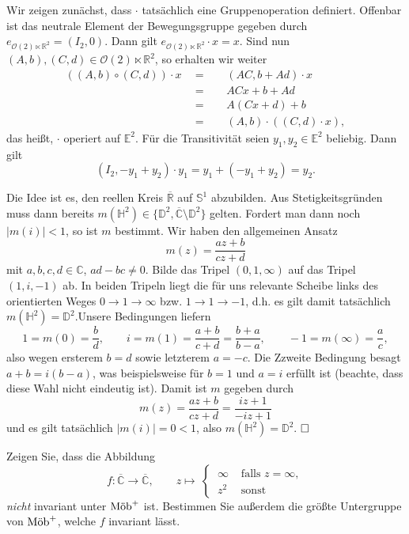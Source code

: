 \documentclass[11pt]{book}
\numberwithin{dummy}{section}
\theoremstyle{nonumberbreak}
\newenvironment{prob}[1][]{\ifthenelse{\equal{#1}{}}{\problem}{\problem[#1]}\rm}{\endproblem}
\newenvironment{sol}[1][]{\ifthenelse{\equal{#1}{}}{\solution}{\solution[#1]}\rm}{\endsolution}
\newcommand{\C}{\mathbb{C}}
\newcommand{\E}{\mathbb{E}}
\newcommand{\R}{\mathbb{R}}
\newcommand{\Sph}{\mathbb{S}}
\newcommand{\He}{\mathbb{H}}
\newcommand{\RR}{\overline{\mathbb{R}}}
\newcommand{\CC}{\overline{\mathbb{C}}}
\newcommand{\D}{\mathbb{D}}
\newcommand{\la}{\longrightarrow}
\newcommand{\mob}{\textup{Möb}^+}
\begin{document}
\begin{spacing}{1.4}
\begin{prob}
\begin{sol}
\begin{compactenum}
\item Wir zeigen zunächst, dass $\cdot$ tatsächlich eine Gruppenoperation definiert. Offenbar ist das neutrale Element der Bewegungsgruppe gegeben durch $e_{\mathcal{O}(2) \ltimes \R^2}=(I_2, 0)$. Dann gilt 
$e_{\mathcal{O}(2) \ltimes \R^2} \cdot x =x.$ Sind nun $(A,b),(C,d) \in \mathcal{O}(2) \ltimes \R^2$, so erhalten wir weiter
\begin{alignat*}{5}
\left( (A,b) \circ (C,d)\right) \cdot x \ \ &=&& \ \ (AC,b+Ad) \cdot x\\
&=&& \ \ ACx+b + Ad \\
&=&& \ \ A(Cx+d) + b \\
&=&& \ \ (A,b) \cdot \left( (C,d) \cdot x\right),
\end{alignat*}
das heißt, $\cdot$ operiert auf $\E^2$. Für die Transitivität seien $y_1, y_2 \in \E^2$ beliebig. Dann gilt 
$$(I_2, -y_1+y_2) \cdot y_1 = y_1 + (-y_1+y_2) =y_2.$$
\item Die Idee ist es, den reellen Kreis $\RR$ auf $\Sph^1$ abzubilden. Aus Stetigkeitsgründen muss dann bereits $m(\He^2) \in \{ \mathbb{D}^2, \CC \setminus \mathbb{D}^2\}$ gelten. Fordert man dann noch $\vert m(i)\vert <1$, so ist $m$ bestimmt. Wir haben den allgemeinen Ansatz 
$$m(z) = \frac{az+b}{cz+d}$$
mit $a,b,c,d \in \C$, $ad-bc \neq0$. Bilde das Tripel $(0,1, \infty)$ auf das Tripel $(1,i,-1)$ ab. In beiden Tripeln liegt die für uns relevante Scheibe links des orientierten Weges $0\la1\la\infty$ bzw. $1 \la 1\la-1$, d.h. es gilt damit tatsächlich $m(\He^2)=\mathbb{D}^2$.Unsere Bedingungen liefern
$$1=m(0)=\frac{b}{d}, \qquad i=m(1)=\frac{a+b}{c+d}=\frac{b+a}{b-a}, \qquad -1=m(\infty)=\frac{a}{c},$$
also wegen ersterem $b=d$ sowie letzterem $a=-c$. Die Zzweite Bedingung besagt $a+b=i(b-a)$, was beispielsweise für $b=1$ und $a=i$ erfüllt ist (beachte, dass diese Wahl nicht eindeutig ist). Damit ist $m$ gegeben durch 
$$m(z)=\frac{az+b}{cz+d}=\frac{iz+1}{-iz+1}$$
und es gilt tatsächlich $\vert m(i)\vert = 0 <1$, also $m(\He^2)=\D^2$. $\hfill \Box$

\end{compactenum}
\end{sol}

\end{prob}





\begin{prob}   %
Zeigen Sie, dass die Abbildung 
$$f: \CC \la \CC, \qquad z \mapsto \ \begin{cases} \ \infty & \textrm{ falls }z=\infty, \\ \ z^2 & \textrm{ sonst } \end{cases} $$
\textit{nicht} invariant unter $\mob$ ist. Bestimmen Sie außerdem die größte Untergruppe von $\mob$, welche $f$ invariant lässt.


\end{prob}
\end{spacing}
\end{document}
